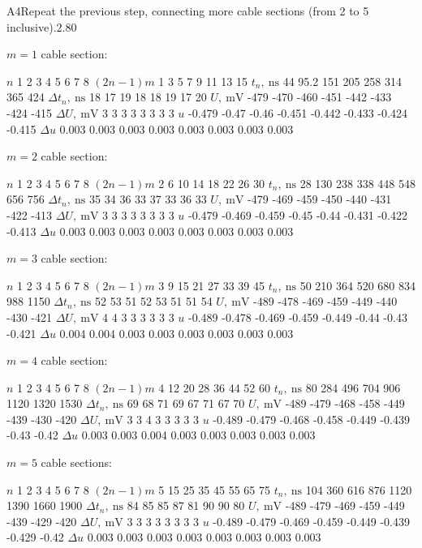 \documentclass[11pt,a4paper]{article}
\begin{document}
\begin{solcard}{A4}{Repeat the previous step, connecting more cable sections (from 2 to 5 inclusive).}{2.80}

$m=1$ cable section:


$n$ 1 2 3 4 5 6 7 8 $(2n-1)m$ 1 3 5 7 9 11 13 15 $t_n, ~\mathrm{ns}$ 44 95.2 151 205 258 314 365 424 $\Delta t_n,~\mathrm{ns}$ 18 17 19 18 18 19 17 20 $U,~\mathrm{mV}$ -479 -470 -460 -451 -442 -433 -424 -415 $\Delta U,~\mathrm{mV}$ 3 3 3 3 3 3 3 3 $u$ -0.479 -0.47 -0.46 -0.451 -0.442 -0.433 -0.424 -0.415 $\Delta u$ 0.003 0.003 0.003 0.003 0.003 0.003 0.003 0.003


$m=2$ cable section:


$n$ 1 2 3 4 5 6 7 8 $(2n-1)m$ 2 6 10 14 18 22 26 30 $t_n, ~\mathrm{ns}$ 28 130 238 338 448 548 656 756 $\Delta t_n,~\mathrm{ns}$ 35 34 36 33 37 33 36 33 $U,~\mathrm{mV}$ -479 -469 -459 -450 -440 -431 -422 -413 $\Delta U,~\mathrm{mV}$ 3 3 3 3 3 3 3 3 $u$ -0.479 -0.469 -0.459 -0.45 -0.44 -0.431 -0.422 -0.413 $\Delta u$ 0.003 0.003 0.003 0.003 0.003 0.003 0.003 0.003


$m=3$ cable section:


$n$ 1 2 3 4 5 6 7 8 $(2n-1)m$ 3 9 15 21 27 33 39 45 $t_n, ~\mathrm{ns}$ 50 210 364 520 680 834 988 1150 $\Delta t_n,~\mathrm{ns}$ 52 53 51 52 53 51 51 54 $U,~\mathrm{mV}$ -489 -478 -469 -459 -449 -440 -430 -421 $\Delta U,~\mathrm{mV}$ 4 4 3 3 3 3 3 3 $u$ -0.489 -0.478 -0.469 -0.459 -0.449 -0.44 -0.43 -0.421 $\Delta u$ 0.004 0.004 0.003 0.003 0.003 0.003 0.003 0.003


$m=4$ cable section:


$n$ 1 2 3 4 5 6 7 8 $(2n-1)m$ 4 12 20 28 36 44 52 60 $t_n, ~\mathrm{ns}$ 80 284 496 704 906 1120 1320 1530 $\Delta t_n,~\mathrm{ns}$ 69 68 71 69 67 71 67 70 $U,~\mathrm{mV}$ -489 -479 -468 -458 -449 -439 -430 -420 $\Delta U,~\mathrm{mV}$ 3 3 4 3 3 3 3 3 $u$ -0.489 -0.479 -0.468 -0.458 -0.449 -0.439 -0.43 -0.42 $\Delta u$ 0.003 0.003 0.004 0.003 0.003 0.003 0.003 0.003


$m=5$ cable sections:


$n$ 1 2 3 4 5 6 7 8 $(2n-1)m$ 5 15 25 35 45 55 65 75 $t_n, ~\mathrm{ns}$ 104 360 616 876 1120 1390 1660 1900 $\Delta t_n,~\mathrm{ns}$ 84 85 85 87 81 90 90 80 $U,~\mathrm{mV}$ -489 -479 -469 -459 -449 -439 -429 -420 $\Delta U,~\mathrm{mV}$ 3 3 3 3 3 3 3 3 $u$ -0.489 -0.479 -0.469 -0.459 -0.449 -0.439 -0.429 -0.42 $\Delta u$ 0.003 0.003 0.003 0.003 0.003 0.003 0.003 0.003

\end{solcard}
\end{document}
